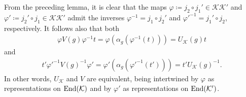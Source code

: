 \noindent From the preceding lemma, it is clear that the maps $\varphi \coloneqq j_2 \circ j_1' \in \mathcal{K}\mathcal{K}'$ and $\varphi' \coloneqq j_2' \circ j_1 \in \mathcal{K}\mathcal{K}'$ admit the inverses $\varphi^{-1} = j_1 \circ j_2'$ and $\varphi'^{-1} = j_1' \circ j_2$, respectively. It follows also that both
\begin{align*}
\varphi V(g) \varphi^{-1} t = \varphi(\alpha_g(\varphi^{-1}(t))) = U_\mathcal{K}(g)t
\end{align*}
\noindent and
\begin{align*}
t' \varphi'^{-1} V(g)^{-1} \varphi' = \varphi'(\alpha_g(\varphi'^{-1}(t'))) = t'U_\mathcal{K}(g)^{-1}.
\end{align*}
\noindent In other words, $U_\mathcal{K}$ and $V$ are equivalent, being intertwined by $\varphi$ as representations on $\textup{End}(\mathcal{K})$ and by $\varphi'$ as representations on $\textup{End}(\mathcal{K}')$.\\


